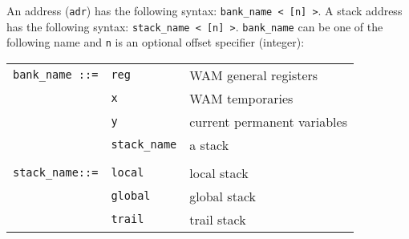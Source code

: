 An address ({\tt adr}) has the following syntax: {\tt bank\_name < [n]
>}. A stack address has the following syntax: {\tt stack\_name < [n] >}.
{\tt bank\_name} can be one of the following name and {\tt n} is an
optional offset specifier (integer):\\

\begin{center}
\begin{tabular}{|lll|}
\hline
{\tt bank\_name ::=} & {\tt reg}	 & WAM general registers 	\\
		     & {\tt x}		 & WAM temporaries 		\\
		     & {\tt y}		 & current permanent variables 	\\
		     & {\tt stack\_name} & a stack			\\
		     &			 &				\\
{\tt stack\_name::=} & {\tt local}	 & local stack 			\\
		     & {\tt global}	 & global stack 		\\
		     & {\tt trail}	 & trail stack   		\\
\hline
\end{tabular}
\end{center}






